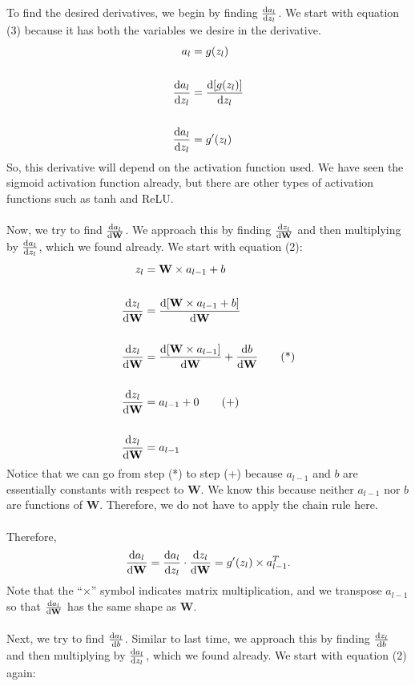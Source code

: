 \documentclass{article}
\begin{document}
To find the desired derivatives, we begin by finding $\diff{a_l}{z_l}$. We start with equation (3) because it has both the variables we desire in the derivative. 
\begin{align*}
    a_l &= g(z_l)\\\\
    \diff{a_l}{z_l} &= \diff{[g(z_l)]}{z_l}\\\\
    \diff{a_l}{z_l} &= g'(z_l)
\end{align*}
So, this derivative will depend on the activation function used. We have seen the sigmoid activation function already, but there are other types of activation functions such as tanh and ReLU.
\\
\\
Now, we try to find $\diff{a_l}{\textbf{W}}$. We approach this by finding $\diff{z_l}{\textbf{W}}$ and then multiplying by $\diff{a_l}{z_l}$, which we found already. We start with equation (2):
\begin{align*}
    z_l &= \textbf{W} \times a_{l-1} + b\\\\
    \diff{z_l}{\textbf{W}} &= \diff{[\textbf{W} \times a_{l-1} + b]}{\textbf{W}}\\\\
    \diff{z_l}{\textbf{W}} &= \diff{[\textbf{W} \times a_{l-1}]}{\textbf{W}} + \diff{b}{\textbf{W}}\tag{*}\\\\
    \diff{z_l}{\textbf{W}} &= a_{l-1} + 0\tag{+}\\\\
    \diff{z_l}{\textbf{W}} &= a_{l-1}
\end{align*}
Notice that we can go from step (*) to step (+) because $a_{l-1}$ and $b$ are essentially constants with respect to \textbf{W}. We know this because neither $a_{l-1}$ nor $b$ are functions of \textbf{W}. Therefore, we do not have to apply the chain rule here.
\\
\\
Therefore, 
\[\diff{a_l}{\textbf{W}}=\diff{a_l}{z_l}\cdot \diff{z_l}{\textbf{W}} = g'(z_l) \times a_{l-1}^T.\]
Note that the ``$\times$'' symbol indicates matrix multiplication, and we transpose $a_{l-1}$ so that $\diff{a_l}{\textbf{W}}$ has the same shape as \textbf{W}. 
\\
\\
Next, we try to find $\diff{a_l}{b}$. Similar to last time, we approach this by finding $\diff{z_l}{b}$ and then multiplying by $\diff{a_l}{z_l}$, which we found already. We start with equation (2) again:
\end{document}
